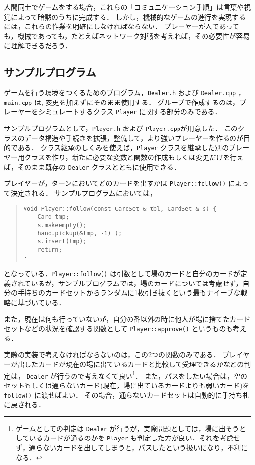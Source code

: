 人間同士でゲームをする場合，これらの「コミュニケーション手順」は言葉や視覚によって暗黙のうちに完成する．
しかし，機械的なゲームの進行を実現するには，これらの作業を明確にしなければならない．
プレーヤーが人であっても，機械であっても，たとえばネットワーク対戦を考えれば，その必要性が容易に理解できるだろう．


\subsection*{サンプルプログラム}
ゲームを行う環境をつくるためのプログラム，\verb+Dealer.h+ および \verb+Dealer.cpp+ ，\verb+main.cpp+ は, 変更を加えずにそのまま使用する．
グループで作成するのは，プレーヤーをシミュレートするクラス \verb+Player+ に関する部分のみである．

サンプルプログラムとして，\verb+Player.h+ および \verb+Player.cpp+が用意した．
このクラスのデータ構造や手続きを拡張，整備して，より強いプレーヤーを作るのが目的である．
クラス継承のしくみを使えば，\verb+Player+ クラスを継承した別のプレーヤー用クラスを作り，新たに必要な変数と関数の作成もしくは変更だけを行えば，そのまま既存の \verb+Dealer+ クラスとともに使用できる．

プレイヤーが，ターンにおいてどのカードを出すかは \verb+Player::follow()+ によって決定される．
サンプルプログラムにおいては，
\begin{quote}
\begin{verbatim}
void Player::follow(const CardSet & tbl, CardSet & s) {
    Card tmp;
    s.makeempty();
    hand.pickup(&tmp, -1) );
    s.insert(tmp);
    return;
}
\end{verbatim}
\end{quote}
となっている．\verb+Player::follow()+ は引数として場のカードと自分のカードが定義されているが，サンプルプログラムでは，場のカードについては考慮せず，自分の手持ちのカードセットからランダムに1枚引き抜くという最もナイーブな戦略に基づいている．

また，現在は何も行っていないが，自分の番以外の時に他人が場に捨てたカードセットなどの状況を確認する関数として \verb+Player::approve()+ というものも考える．
 
実際の実装で考えなければならないのは，この2つの関数のみである．
プレイヤーが出したカードが現在の場に出ているカードと比較して受理できるかなどの判定は， \verb+Dealer+ が行うので考えなくて良い\footnote{ゲームとしての判定は \verb+Dealer+ が行うが，実際問題としては，場に出そうとしているカードが通るのかを \verb+Player+ も判定した方が良い．それを考慮せず，通らないカードを出してしまうと，パスしたという扱いになり，不利になる．}．
また，パスをしたい場合は，空のセットもしくは通らないカード(現在，場に出ているカードよりも弱いカード)を \verb+follow()+ に渡せばよい．
その場合，通らないカードセットは自動的に手持ち札に戻される．
 
